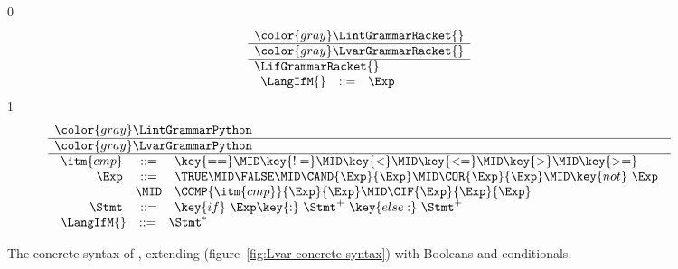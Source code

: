 \documentclass[7x10]{TimesAPriori_MIT}%
\newcommand{\gray}[1]{{\color{gray} #1}}
\def\racketEd{0}
\def\pythonEd{1}
\def\edition{1}
\newcommand{\pythonColor}[0]{}
\numberwithin{theorem}{chapter}
\numberwithin{definition}{chapter}
\numberwithin{equation}{chapter}
\begin{document}
\newcommand{\LifGrammarPython}{
\begin{array}{rcl}
  \itm{cmp} &::= & \key{==} \MID \key{!=} \MID \key{<} \MID \key{<=} \MID \key{>} \MID \key{>=} \\
\Exp &::=& \TRUE \MID \FALSE \MID \CAND{\Exp}{\Exp} \MID \COR{\Exp}{\Exp}
  \MID \key{not}~\Exp \\
  &\MID& \CCMP{\itm{cmp}}{\Exp}{\Exp}
  \MID \CIF{\Exp}{\Exp}{\Exp} \\
  \Stmt &::=& \key{if}~ \Exp \key{:}~ \Stmt^{+} ~\key{else:}~ \Stmt^{+}
\end{array}
}
\newcommand{\LifASTPython}{
\begin{array}{lcl}
\itm{boolop} &::=& \code{And()} \MID \code{Or()} \\
\itm{cmp} &::= & \code{Eq()} \MID \code{NotEq()} \MID \code{Lt()} \MID \code{LtE()} \MID \code{Gt()} \MID \code{GtE()} \\
\itm{bool} &::=& \code{True} \MID \code{False} \\
\Exp &::=& \BOOL{\itm{bool}} 
      \MID \BOOLOP{\itm{boolop}}{\Exp}{\Exp}\\
      &\MID& \UNIOP{\key{Not()}}{\Exp}
      \MID \CMP{\Exp}{\itm{cmp}}{\Exp} \\
      &\MID& \IF{\Exp}{\Exp}{\Exp} \\
\Stmt{} &::=& \IFSTMT{\Exp}{\Stmt^{+}}{\Stmt^{+}}
\end{array}
}


\begin{figure}[tp]
\centering
\begin{tcolorbox}[colback=white]
{\if\edition\racketEd    
\[
\begin{array}{l}
  \gray{\LintGrammarRacket{}} \\ \hline
  \gray{\LvarGrammarRacket{}} \\ \hline
  \LifGrammarRacket{} \\ 
  \begin{array}{lcl}
    \LangIfM{} &::=& \Exp
  \end{array}
\end{array}
\]
\fi}
{\if\edition\pythonEd\pythonColor
\[
\begin{array}{l}
  \gray{\LintGrammarPython} \\ \hline
  \gray{\LvarGrammarPython}  \\ \hline
  \LifGrammarPython \\  
\begin{array}{rcl}
  \LangIfM{} &::=& \Stmt^{*}
\end{array}
\end{array}
\]
\fi}
\end{tcolorbox}
\caption{The concrete syntax of \LangIf{}, extending \LangVar{}
  (figure~\ref{fig:Lvar-concrete-syntax}) with Booleans and conditionals.}
\label{fig:Lif-concrete-syntax}
\end{figure}
\end{document}
